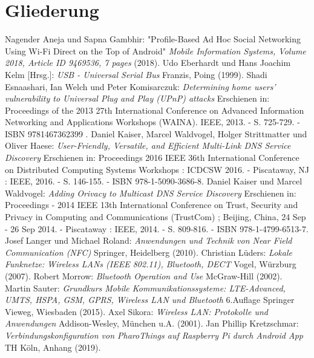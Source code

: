 \documentclass[12pt,a4paper]{article}
\renewcommand{\contentsname}{Gliederung}
\renewcommand{\lstlistlistingname}{Verzeichnis der Algorithmen}
\begin{document}
    \section*{\contentsname}
    \startcontents
	\pagebreak
	
    
    
    
    
    
    

    \addcontentsline{toc}{section}{\lstlistlistingname}
    \lstlistoflistings
    \pagebreak
    
    \renewcommand\refname{Literaturverzeichnis}
    \begin{thebibliography}{10}
        Nagender Aneja und Sapna Gambhir: "Profile-Based Ad Hoc Social Networking Using Wi-Fi Direct on the Top of Android" {\it Mobile Information Systems, Volume 2018, Article ID 9469536, 7 pages} (2018).
         Udo Eberhardt und Hans Joachim Kelm [Hrsg.]: {\it USB - Universal Serial Bus} Franzis, Poing (1999).
         Shadi Esnaashari, Ian Welch und Peter Komisarczuk: {\it Determining home users' vulnerability to Universal Plug and Play (UPnP) attacks} Erschienen in: Proceedings of the 2013 27th International Conference on Advanced Information Networking and Applications Workshops (WAINA). IEEE, 2013. - S. 725-729. - ISBN 9781467362399 .
         Daniel Kaiser, Marcel Waldvogel, Holger Strittmatter und Oliver Haese: {\it User-Friendly, Versatile, and Efficient Multi-Link DNS Service Discovery} Erschienen in: Proceedings 2016 IEEE 36th International Conference on Distributed Computing Systems Workshops : ICDCSW 2016. - Piscataway, NJ : IEEE, 2016. - S. 146-155. - ISBN 978-1-5090-3686-8.
         Daniel Kaiser und Marcel Waldvogel: {\it Adding Orivacy to Multicast DNS Service Discovery} Erschienen in: Proceedings - 2014 IEEE 13th International Conference on Trust, Security and Privacy in Computing and Communications (TrustCom) ; Beijing, China, 24 Sep - 26 Sep 2014. - Piscataway : IEEE, 2014. - S. 809-816. - ISBN 978-1-4799-6513-7.
        Josef Langer und Michael Roland: {\it Anwendungen und Technik von Near Field Communication (NFC)} Springer, Heidelberg (2010).
        Christian Lüders: {\it Lokale Funknetze: Wireless LANs (IEEE 802.11), Bluetooth, DECT} Vogel, Würzburg (2007).
        Robert Morrow: {\it Bluetooth Operation and Use} McGraw-Hill (2002).
        Martin Sauter: {\it Grundkurs Mobile Kommunikationssysteme: LTE-Advanced, UMTS, HSPA, GSM, GPRS, Wireless LAN und Bluetooth} 6.Auflage Springer Vieweg, Wiesbaden (2015).
        Axel Sikora: {\it Wireless LAN: Protokolle und Anwendungen} Addison-Wesley, München u.A. (2001).
		 Jan Phillip Kretzschmar: {\it Verbindungskonfiguration von PharoThings auf Raspberry Pi durch Android App} TH Köln, Anhang (2019).
    \end{thebibliography}
    \pagebreak
    
\end{document}
